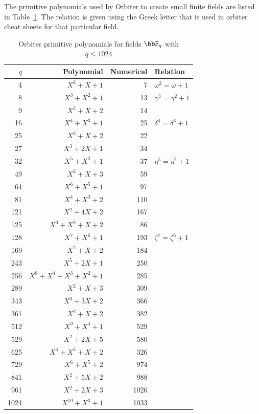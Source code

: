 The primitive polynomials used by Orbiter to create small finite fields 
are listed in Table~\ref{tab:primitive:polynomials}. 
The relation is given using the Greek letter that 
is used in orbiter cheat sheets for that particular field.
\begin{table}
\begin{center}
\begin{tabular}{|r|r|r|l|}
\hline
$q$  & Polynomial & Numerical & Relation \\
\hline
\hline
4 & $X^2+X+1$ & 7 & $\omega^2 = \omega+1$ \\
8 & $X^3 + X^2 + 1$ & 13 & $\gamma^3 = \gamma^2+1$ \\
9 & $X^2 + X + 2$ & 14 & \\
16 & $X^4 + X^3 + 1$ & 25 &$\delta^4=\delta^3+1$ \\
25 & $X^{2} + X + 2$ & 22 & \\
27 & $X^3 + 2X + 1$ & 34 & \\
32 & $X^5 + X^2 + 1$ & 37 & $\eta^5=\eta^2+1$ \\
49 & $X^{2} + X + 3$ & 59 & \\
64 & $X^6 + X^5 + 1$ & 97 & \\
81 & $X^4 + X^3 + 2$ & 110 & \\
121 & $X^{2} + 4X + 2$ & 167 & \\
125 & $X^{3} + X^{2} + X + 2$ & 86 & \\
128 & $X^7 + X^6 + 1$ & 193 & $\zeta^7=\zeta^6+1$ \\
169 & $X^{2} + X + 2$ & 184 & \\
243 & $X^5 + 2X + 1$ & 250 & \\
256 & $X^8 + X^4 + X^3 + X^2 + 1$ & 285 & \\
289 & $X^{2} + X + 3$ & 309 & \\
343 & $X^{3} + 3X + 2$ & 366 & \\
361 & $X^{2} + X + 2$ & 382 & \\
512 & $ X^9 + X^4 + 1$ & 529 & \\
529 & $X^{2} + 2X + 5$ & 580 & \\
625 & $X^{4} + X^{3} + X + 2$ & 326 & \\
729 & $X^6 + X^5 + 2$ & 974 & \\
841 & $X^{2} + 5X + 2$ & 988 & \\
961 & $X^{2} + 2X + 3$ & 1026 & \\
1024 & $X^{10} + X^3 + 1$ & 1033 & \\
\hline
\end{tabular}
\end{center}
\caption{\label{tab:primitive:polynomials}Orbiter primitive polynomials for fields $\bbF_q$ with $q \le 1024$}
\end{table}




